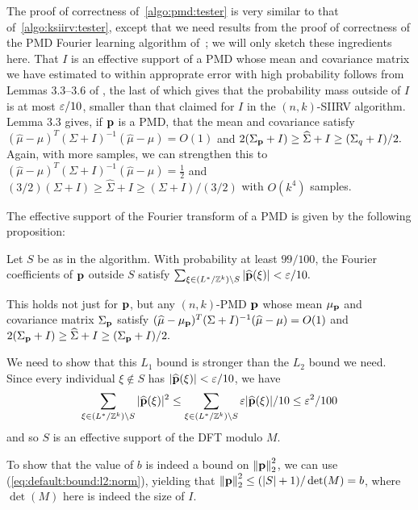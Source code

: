 The proof of correctness of~\cref{algo:pmd:tester} is very similar to that of~\cref{algo:ksiirv:tester}, except that we need results from the proof of correctness of the PMD Fourier learning algorithm of~\cite{DKS:15c}; we will only sketch these ingredients here. That $I$ is an effective support of a PMD whose mean and covariance matrix we have estimated to within approprate error with high probability follows from Lemmas 3.3--3.6 of \cite{DKS:15c}, the last of which gives that the probability mass outside of $I$ is at most $\varepsilon/10$, smaller than that claimed for $I$ in the $(n,k)$-SIIRV algorithm. Lemma 3.3 gives, if $\mathbf{p}$ is a PMD, that the mean and covariance satisfy $(\widehat{\mu}-\mu)^T(\Sigma+I)^{-1}(\widehat{\mu}-\mu) = O(1)$ and $2(\Sigma_{\mathbf{p}}+I) \geq \widehat{\Sigma}+I \geq (\Sigma_q+I)/2.$ Again, with more samples, we can strengthen this to $(\widehat{\mu}-\mu)^T(\Sigma+I)^{-1}(\widehat{\mu}-\mu) = \frac{1}{2}$ and $(3/2)(\Sigma+I) \geq \widehat{\Sigma}+I \geq (\Sigma+I)/(3/2)$ with $O(k^4)$ samples.

\noindent The effective support of the Fourier transform of a PMD is given by the following proposition:
\begin{proposition} \label{prop:ft-effective-support}
Let $S$ be as in the algorithm. With probability at least $99/100$, the Fourier coefficients of $\mathbf{p}$ outside $S$ satisfy
$\sum_{\xi \in (L^{\ast}/\mathbb{Z}^k)  \setminus S }|\widehat{\mathbf{p}}(\xi)| < \varepsilon/10.$

This holds not just for $\mathbf{p}$, but any $(n,k)$-PMD $\mathbf{p}$ whose mean $\mu_{\mathbf{p}}$ and covariance matrix $\Sigma_{\mathbf{p}}$ satisfy $(\widehat{\mu}-\mu_{\mathbf{p}})^T(\Sigma+I)^{-1}(\widehat{\mu}-\mu) = O(1)$ and $2(\Sigma_{\mathbf{p}}+I) \geq \widehat{\Sigma}+I \geq (\Sigma_{\mathbf{p}}+I)/2.$
\end{proposition}

We need to show that this $L_1$ bound is stronger than the $L_2$ bound we need. Since every individual $\xi \notin S$ has $|\widehat{\mathbf{p}}(\xi)| < \varepsilon/10$, we have
$$\sum_{\xi \in (L^{\ast}/\mathbb{Z}^k)  \setminus S }|\widehat{\mathbf{p}}(\xi)|^2 \leq \sum_{\xi \in (L^{\ast}/\mathbb{Z}^k)  \setminus S } \varepsilon |\widehat{\mathbf{p}}(\xi)|/10 \leq \varepsilon^2/100$$
and so $S$ is an effective support of the DFT modulo $M$.


To show that the value of $b$ is indeed a bound on ${\lVert\mathbf{p}{\rVert}}_2^2$, we can use (\ref{eq:default:bound:l2:norm}), yielding that ${\lVert\mathbf{p}{\rVert}}_2^2 \leq (|S|+1)/\det(M) = b $, where $\det(M)$ here is indeed the size of $I$.

